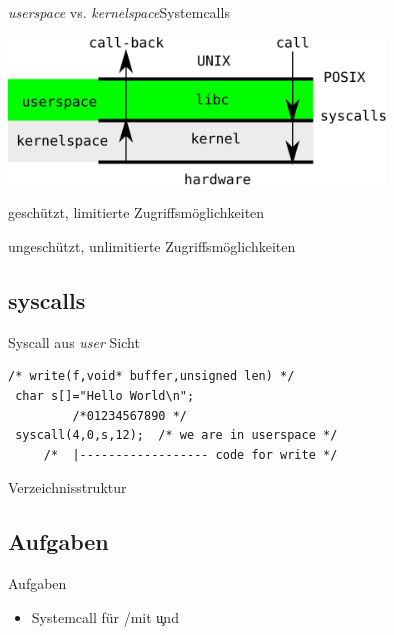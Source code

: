 \begin{frame}{{\em userspace} vs. {\em kernelspace}}{Systemcalls}
\begin{center}
\includegraphics[width=10cm]{userspace-kernelspace.pdf}
\end{center}
\begin{description}[kernelspace]
 \item[userspace] geschützt, limitierte Zugriffsmöglichkeiten
 \item[kernelspace] ungeschützt, unlimitierte Zugriffsmöglichkeiten
\end{description}
\end{frame}

\subsection{syscalls}
\begin{frame}[fragile]{Syscall aus {\em user} Sicht }{}
 \begin{lstlisting}[basicstyle=\footnotesize]
 /* write(f,void* buffer,unsigned len) */
 char s[]="Hello World\n";
         /*01234567890 */
 syscall(4,0,s,12);  /* we are in userspace */
     /*  |------------------ code for write */
 \end{lstlisting}
\end{frame}

\begin{frame}{Verzeichnisstruktur}
\end{frame}

\subsection{Aufgaben}
\begin{frame}{Aufgaben}
 \begin{itemize}
  \item Systemcall für \host/\targetS mit \c und \cpp
 \end{itemize}
\end{frame}
